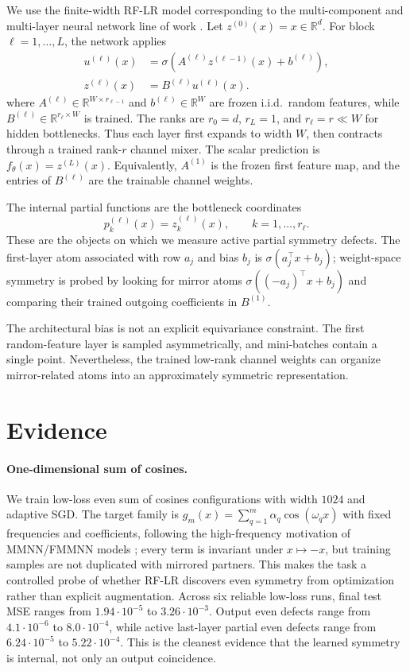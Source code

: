 \documentclass[nohyperref]{article}
\begin{document}
We use the finite-width RF-LR model corresponding to the multi-component and multi-layer neural network line of work \citep{zhang2024structured}.
Let $z^{(0)}(x)=x\in\mathbb{R}^{d}$.
For block $\ell=1,\ldots,L$, the network applies
\begin{align*}
u^{(\ell)}(x)
&=
\sigma\!\left(A^{(\ell)} z^{(\ell-1)}(x)+b^{(\ell)}\right),\\
z^{(\ell)}(x)
&=
B^{(\ell)}u^{(\ell)}(x).
\end{align*}
where $A^{(\ell)}\in\mathbb{R}^{W\times r_{\ell-1}}$ and $b^{(\ell)}\in\mathbb{R}^{W}$ are frozen i.i.d.\ random features, while $B^{(\ell)}\in\mathbb{R}^{r_\ell\times W}$ is trained.
The ranks are $r_0=d$, $r_L=1$, and $r_\ell=r\ll W$ for hidden bottlenecks.
Thus each layer first expands to width $W$, then contracts through a trained rank-$r$ channel mixer.
The scalar prediction is $f_\theta(x)=z^{(L)}(x)$.
Equivalently, $A^{(1)}$ is the frozen first feature map, and the entries of $B^{(\ell)}$ are the trainable channel weights.

The internal partial functions are the bottleneck coordinates
\[
p_k^{(\ell)}(x)=z_k^{(\ell)}(x),
\qquad
k=1,\ldots,r_\ell.
\]
These are the objects on which we measure active partial symmetry defects.
The first-layer atom associated with row $a_j$ and bias $b_j$ is $\sigma(a_j^\top x+b_j)$; weight-space symmetry is probed by looking for mirror atoms $\sigma((-a_j)^\top x+b_j)$ and comparing their trained outgoing coefficients in $B^{(1)}$.

The architectural bias is not an explicit equivariance constraint.
The first random-feature layer is sampled asymmetrically, and mini-batches contain a single point.
Nevertheless, the trained low-rank channel weights can organize mirror-related atoms into an approximately symmetric representation.



\section{Evidence}

\paragraph{One-dimensional sum of cosines.}
We train low-loss even sum of cosines configurations with width $1024$ and adaptive SGD.
The target family is $g_m(x)=\sum_{q=1}^{m}\alpha_q\cos(\omega_q x)$ with fixed frequencies and coefficients, following the high-frequency motivation of MMNN/FMMNN models \citep{zhang2024structured,zhang2025fourier}; every term is invariant under $x\mapsto -x$, but training samples are not duplicated with mirrored partners.
This makes the task a controlled probe of whether RF-LR discovers even symmetry from optimization rather than explicit augmentation.
Across six reliable low-loss runs, final test MSE ranges from $1.94\cdot10^{-5}$ to $3.26\cdot10^{-3}$.
Output even defects range from $4.1\cdot10^{-6}$ to $8.0\cdot10^{-4}$, while active last-layer partial even defects range from $6.24\cdot10^{-5}$ to $5.22\cdot10^{-4}$.
This is the cleanest evidence that the learned symmetry is internal, not only an output coincidence.
\end{document}
